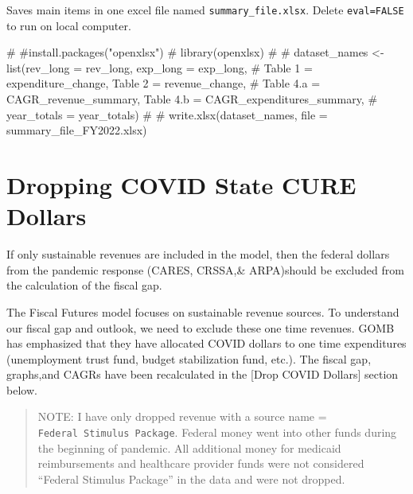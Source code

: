 \documentclass[
  letterpaper,
  DIV=11,
  numbers=noendperiod]{scrreport}
\newenvironment{Shaded}{\begin{snugshade}}{\end{snugshade}}
\newcommand{\CommentTok}[1]{\textcolor[rgb]{0.37,0.37,0.37}{#1}}
\begin{document}
Saves main items in one excel file named \texttt{summary\_file.xlsx}.
Delete \texttt{eval=FALSE} to run on local computer.

\begin{Shaded}
\begin{Highlighting}[]
\CommentTok{\# \#install.packages("openxlsx")}
\CommentTok{\# library(openxlsx)}
\CommentTok{\# }
\CommentTok{\# dataset\_names \textless{}{-} list(\textquotesingle{}rev\_long\textquotesingle{} = rev\_long, \textquotesingle{}exp\_long\textquotesingle{} = exp\_long, }
\CommentTok{\#                       \textasciigrave{}Table 1\textasciigrave{} = expenditure\_change, \textasciigrave{}Table 2\textasciigrave{} = revenue\_change,}
\CommentTok{\#                       \textquotesingle{}Table 4.a\textquotesingle{} = CAGR\_revenue\_summary, \textquotesingle{}Table 4.b\textquotesingle{} = CAGR\_expenditures\_summary, }
\CommentTok{\#                       \textquotesingle{}year\_totals\textquotesingle{} = year\_totals)}
\CommentTok{\# }
\CommentTok{\# write.xlsx(dataset\_names, file = \textquotesingle{}summary\_file\_FY2022.xlsx\textquotesingle{})}
\end{Highlighting}
\end{Shaded}


\hypertarget{dropping-covid-state-cure-dollars}{%
\chapter{Dropping COVID State CURE
Dollars}\label{dropping-covid-state-cure-dollars}}

If only sustainable revenues are included in the model, then the federal
dollars from the pandemic response (CARES, CRSSA,\& ARPA)should be
excluded from the calculation of the fiscal gap.

The Fiscal Futures model focuses on sustainable revenue sources. To
understand our fiscal gap and outlook, we need to exclude these one time
revenues. GOMB has emphasized that they have allocated COVID dollars to
one time expenditures (unemployment trust fund, budget stabilization
fund, etc.). The fiscal gap, graphs,and CAGRs have been recalculated in
the {[}Drop COVID Dollars{]} section below.

\begin{quote}
NOTE: I have only dropped revenue with a source name =
\texttt{Federal\ Stimulus\ Package}. Federal money went into other funds
during the beginning of pandemic. All additional money for medicaid
reimbursements and healthcare provider funds were not considered
``Federal Stimulus Package'' in the data and were not dropped.
\end{quote}
\end{document}

